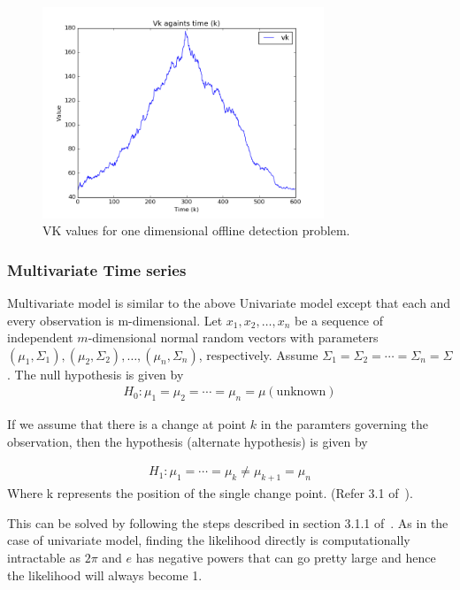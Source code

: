 \documentclass{article}
\begin{document}
\begin{figure}[ht!]
  \centering
  \includegraphics[width=0.75\textwidth]{images/1d_offline/vk}
  \caption{VK values for one dimensional offline detection problem.\label{fig:1d_vk}}
\end{figure}


\subsubsection{Multivariate Time series}

Multivariate model is similar to the above Univariate model except that each and every observation is m-dimensional.
Let $x_{1}, x_{2}, \ldots , x_{n}$ be a sequence of independent $m$-dimensional normal random vectors with parameters $(\mu_{1}, \Sigma_{1}), (\mu_{2}, \Sigma_{2}), \ldots, (\mu_{n}, \Sigma_{n})$, respectively.
Assume $\Sigma_{1} = \Sigma_{2} = \cdots = \Sigma_{n} = \Sigma $.
The null hypothesis is given by 
\begin{align}
H_{0} : \mu_{1} = \mu_{2} = \cdots = \mu_{n} = \mu (\mathrm{unknown})
\end{align}

If we assume that there is a change at point $k$ in the paramters governing the observation, then the hypothesis (alternate hypothesis) is given by

\begin{align}
H_{1} : \mu_{1} = \cdots = \mu_{k} \ne \mu_{k+1} = \mu_{n}
\end{align}
Where k represents the position of the single change point. (Refer 3.1 of~\cite{birkhauser_pscpa}).

This can be solved by following the steps described in section 3.1.1 of~\cite{birkhauser_pscpa}.  As in the case of univariate model, finding the likelihood directly is computationally intractable as $2\pi$ and $e$ has negative powers that can go pretty large and hence the likelihood will always become 1.
\end{document}
